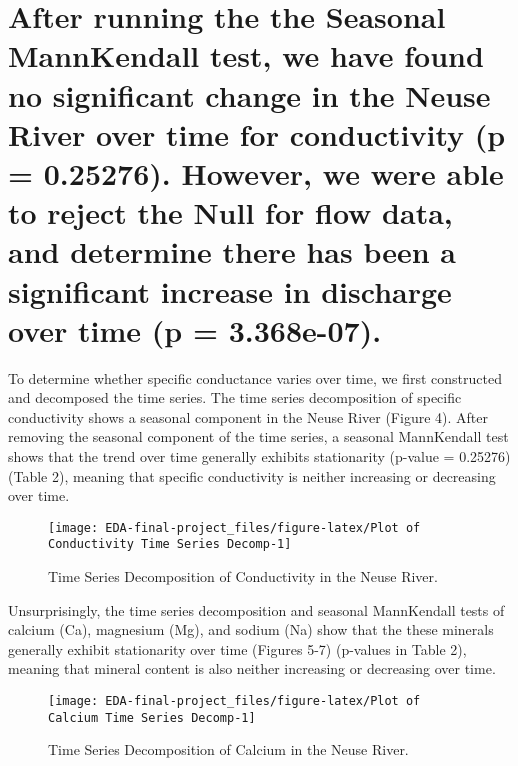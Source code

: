 \documentclass[
  12pt,
]{article}
\begin{document}
\hypertarget{after-running-the-the-seasonal-mannkendall-test-we-have-found-no-significant-change-in-the-neuse-river-over-time-for-conductivity-p-0.25276.-however-we-were-able-to-reject-the-null-for-flow-data-and-determine-there-has-been-a-significant-increase-in-discharge-over-time-p-3.368e-07.}{%
\section{After running the the Seasonal MannKendall test, we have found
no significant change in the Neuse River over time for conductivity (p =
0.25276). However, we were able to reject the Null for flow data, and
determine there has been a significant increase in discharge over time
(p =
3.368e-07).}\label{after-running-the-the-seasonal-mannkendall-test-we-have-found-no-significant-change-in-the-neuse-river-over-time-for-conductivity-p-0.25276.-however-we-were-able-to-reject-the-null-for-flow-data-and-determine-there-has-been-a-significant-increase-in-discharge-over-time-p-3.368e-07.}}

To determine whether specific conductance varies over time, we first
constructed and decomposed the time series. The time series
decomposition of specific conductivity shows a seasonal component in the
Neuse River (Figure 4). After removing the seasonal component of the
time series, a seasonal MannKendall test shows that the trend over time
generally exhibits stationarity (p-value = 0.25276) (Table 2), meaning
that specific conductivity is neither increasing or decreasing over
time.

\begin{figure}

{\centering \texttt{[image: EDA-final-project\_files/figure-latex/Plot of Conductivity Time Series Decomp-1]} 

}

\caption{Time Series Decomposition of Conductivity in the Neuse River.}\label{fig:Plot of Conductivity Time Series Decomp}
\end{figure}

\newpage

Unsurprisingly, the time series decomposition and seasonal MannKendall
tests of calcium (Ca), magnesium (Mg), and sodium (Na) show that the
these minerals generally exhibit stationarity over time (Figures 5-7)
(p-values in Table 2), meaning that mineral content is also neither
increasing or decreasing over time.

\begin{figure}

{\centering \texttt{[image: EDA-final-project\_files/figure-latex/Plot of Calcium Time Series Decomp-1]} 

}

\caption{Time Series Decomposition of Calcium in the Neuse River.}\label{fig:Plot of Calcium Time Series Decomp}
\end{figure}
\end{document}

